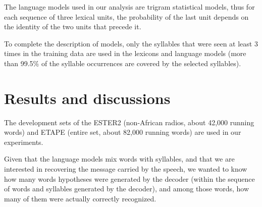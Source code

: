 \documentclass[a4paper]{article}
\begin{document}
The language models used in our analysis are trigram statistical models, thus for each sequence of three lexical units, the probability of the last unit depends on the identity of the two units that precede it.

To complete the description of models, only the syllables that were seen at least 3 times in the training data are used in the lexicons and language models (more than 99.5\% of the syllable occurrences are covered by the selected syllables).


\section{Results and discussions}

The development sets of the ESTER2 (non-African radios, about 42,000 running words) and ETAPE (entire set, about 82,000 running words) are used in our experiments.

Given that the language models mix words with syllables, and that we are interested in recovering the message carried by the speech, we wanted to know how many words hypotheses were generated by the decoder (within the sequence of words and syllables generated by the decoder), and among those words, how many of them were actually correctly recognized.
\end{document}
